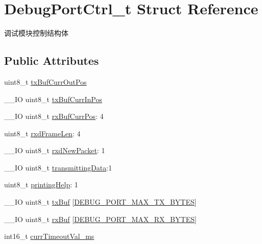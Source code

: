 \hypertarget{struct_debug_port_ctrl__t}{}\section{Debug\+Port\+Ctrl\+\_\+t Struct Reference}
\label{struct_debug_port_ctrl__t}


调试模块控制结构体  


\subsection*{Public Attributes}
\begin{DoxyCompactItemize}
\item 
uint8\+\_\+t \hyperlink{struct_debug_port_ctrl__t_ad20d3bee07bb25efffc16b460a284b93}{tx\+Buf\+Curr\+Out\+Pos}
\item 
\+\_\+\+\_\+\+IO uint8\+\_\+t \hyperlink{struct_debug_port_ctrl__t_a49b6a8213aaa49f338a4d0f1e36417d1}{tx\+Buf\+Curr\+In\+Pos}
\item 
\+\_\+\+\_\+\+IO uint8\+\_\+t \hyperlink{struct_debug_port_ctrl__t_a05dfbd0dfe19afa8f8875fd8851c477d}{rx\+Buf\+Curr\+Pos}\+: 4
\item 
uint8\+\_\+t \hyperlink{struct_debug_port_ctrl__t_a8195a386ae0b033e3c3349e52e69190d}{rxd\+Frame\+Len}\+: 4
\item 
\+\_\+\+\_\+\+IO uint8\+\_\+t \hyperlink{struct_debug_port_ctrl__t_ad978075310623395cb11c19d365ac1c9}{rxd\+New\+Packet}\+: 1
\item 
\+\_\+\+\_\+\+IO uint8\+\_\+t \hyperlink{struct_debug_port_ctrl__t_ae91740bfa0218108dce1c4f30bc2a177}{transmitting\+Data}\+:1
\item 
uint8\+\_\+t \hyperlink{struct_debug_port_ctrl__t_acf4f6f0a4c990e764fe3d6a90eb0c344}{printing\+Help}\+: 1
\item 
\+\_\+\+\_\+\+IO uint8\+\_\+t \hyperlink{struct_debug_port_ctrl__t_a89dc9c8df46977ee0bde19a991de59b7}{tx\+Buf} \mbox{[}\hyperlink{group___debug_port_ga9bca70c95e91f7f2057e7295dea5122e}{D\+E\+B\+U\+G\+\_\+\+P\+O\+R\+T\+\_\+\+M\+A\+X\+\_\+\+T\+X\+\_\+\+B\+Y\+T\+ES}\mbox{]}
\item 
\+\_\+\+\_\+\+IO uint8\+\_\+t \hyperlink{struct_debug_port_ctrl__t_a55232fc2a43e003ae309b908d6765626}{rx\+Buf} \mbox{[}\hyperlink{group___debug_port_ga43802773d24a869de1adfb0d0d869332}{D\+E\+B\+U\+G\+\_\+\+P\+O\+R\+T\+\_\+\+M\+A\+X\+\_\+\+R\+X\+\_\+\+B\+Y\+T\+ES}\mbox{]}
\item 
int16\+\_\+t \hyperlink{struct_debug_port_ctrl__t_a660355da721fa1c7aa7294e39b3b3bfc}{curr\+Timeout\+Val\+\_\+ms}
\end{DoxyCompactItemize}


